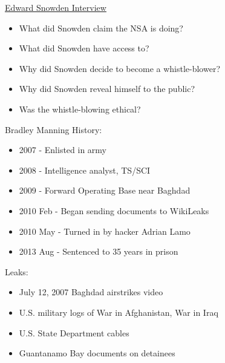 \documentclass{beamer}
\begin{document}
\begin{frame}{\href{http://www.youtube.com/watch?v=kaRvzQ887HM}{Edward Snowden Interview}}
\begin{itemize}
\item What did Snowden claim the NSA is doing?
\bigskip
\item What did Snowden have access to?
\bigskip
\item Why did Snowden decide to become a whistle-blower?
\bigskip
\item Why did Snowden reveal himself to the public?
\bigskip
\item Was the whistle-blowing ethical?
\end{itemize}
\end{frame}

\begin{frame}{Bradley Manning}
History:
\begin{itemize}
\item 2007 - Enlisted in army
\item 2008 - Intelligence analyst, TS/SCI
\item 2009 - Forward Operating Base near Baghdad
\item 2010 Feb - Began sending documents to WikiLeaks
\item 2010 May - Turned in by hacker Adrian Lamo
\item 2013 Aug - Sentenced to 35 years in prison
\end{itemize}
Leaks:
\begin{itemize}
\item July 12, 2007 Baghdad airstrikes video %
\item U.S. military logs of War in Afghanistan, War in Iraq  %
\item U.S. State Department cables %
\item Guantanamo Bay documents on detainees %
\end{itemize}
\end{frame}
\end{document}
